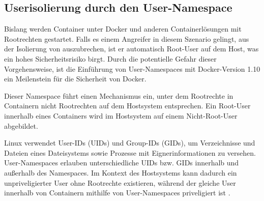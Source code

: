 \documentclass[../main.tex]{subfiles}
\begin{document}


    \subsection{Userisolierung durch den User-Namespace}
			Bislang werden Container unter Docker und anderen Containerlösungen mit Rootrechten gestartet. Falls es einem Angreifer in diesem Szenario gelingt, aus der Isolierung von \cbroken{} auszubrechen, ist er automatisch Root-User auf dem Host, was ein hohes Sicherheitsrisiko birgt. Durch die potentielle Gefahr dieser Vorgehensweise, ist die Einführung von User-Namespaces mit Docker-Version 1.10 ein Meilenstein für die Sicherheit von Docker.

			Dieser Namespace führt einen Mechanismus ein, unter dem Rootrechte in Containern nicht Rootrechten auf dem Hostsystem entsprechen. Ein Root-User innerhalb eines Containers wird im Hostsystem auf einem Nicht-Root-User abgebildet.

			Linux verwendet User-IDs (UIDs) und Group-IDs (GIDs), um Verzeichnisse und Dateien eines Dateisystems sowie Prozesse mit Eignerinformationen zu versehen. User-Namespaces erlauben unterschiedliche UIDs bzw. GIDs innerhalb und außerhalb des Namespaces. Im Kontext des Hostsystems kann dadurch ein unpriveligierter User ohne Rootrechte existieren, während der gleiche User innerhalb von Containern mithilfe von User-Namespaces priveligiert ist \cite{nsUser}.

\end{document}
